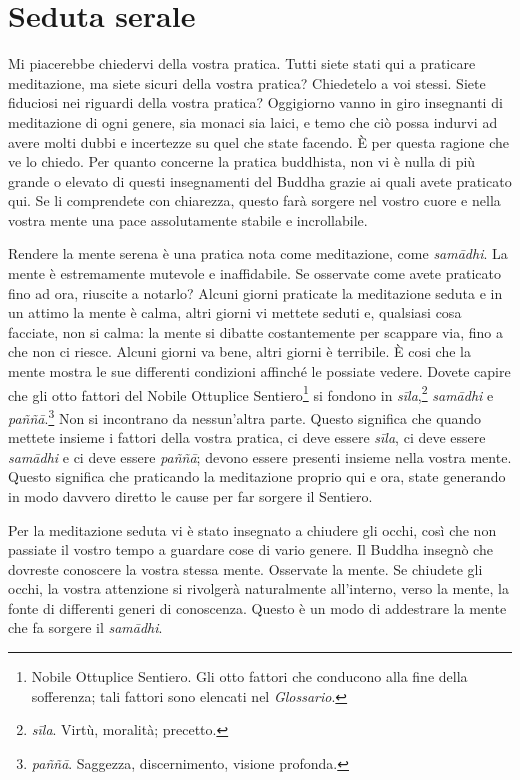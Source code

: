 \chapter{Seduta serale}

Mi piacerebbe chiedervi della vostra pratica. Tutti siete stati qui a
praticare meditazione, ma siete sicuri della vostra pratica? Chiedetelo
a voi stessi. Siete fiduciosi nei riguardi della vostra pratica?
Oggigiorno vanno in giro insegnanti di meditazione di ogni genere, sia
monaci sia laici, e temo che ciò possa indurvi ad avere molti dubbi e
incertezze su quel che state facendo. È per questa ragione che ve lo
chiedo. Per quanto concerne la pratica buddhista, non vi è nulla di più
grande o elevato di questi insegnamenti del Buddha grazie ai quali avete
praticato qui. Se li comprendete con chiarezza, questo farà sorgere nel
vostro cuore e nella vostra mente una pace assolutamente stabile e
incrollabile.

Rendere la mente serena è una pratica nota come meditazione, come
\emph{samādhi}. La mente è estremamente mutevole e inaffidabile. Se
osservate come avete praticato fino ad ora, riuscite a notarlo? Alcuni
giorni praticate la meditazione seduta e in un attimo la mente è calma,
altri giorni vi mettete seduti e, qualsiasi cosa facciate, non si calma:
la mente si dibatte costantemente per scappare via, fino a che non ci
riesce. Alcuni giorni va bene, altri giorni è terribile. È cosi che la
mente mostra le sue differenti condizioni affinché le possiate vedere.
Dovete capire che gli otto fattori del Nobile Ottuplice
Sentiero\footnote{Nobile Ottuplice Sentiero. Gli otto fattori che
  conducono alla fine della sofferenza; tali fattori sono elencati nel
  \emph{Glossario}.} si fondono in \emph{sīla},\footnote{\emph{sīla}.
  Virtù, moralità; precetto.} \emph{samādhi} e \emph{paññā}.\footnote{\emph{paññā}.
  Saggezza, discernimento, visione profonda.} Non si incontrano da
nessun'altra parte. Questo significa che quando mettete insieme i
fattori della vostra pratica, ci deve essere \emph{sīla}, ci deve essere
\emph{samādhi} e ci deve essere \emph{paññā}; devono essere presenti
insieme nella vostra mente. Questo significa che praticando la
meditazione proprio qui e ora, state generando in modo davvero diretto
le cause per far sorgere il Sentiero.

Per la meditazione seduta vi è stato insegnato a chiudere gli occhi,
così che non passiate il vostro tempo a guardare cose di vario genere.
Il Buddha insegnò che dovreste conoscere la vostra stessa mente.
Osservate la mente. Se chiudete gli occhi, la vostra attenzione si
rivolgerà naturalmente all'interno, verso la mente, la fonte di
differenti generi di conoscenza. Questo è un modo di addestrare la mente
che fa sorgere il \emph{samādhi}.

